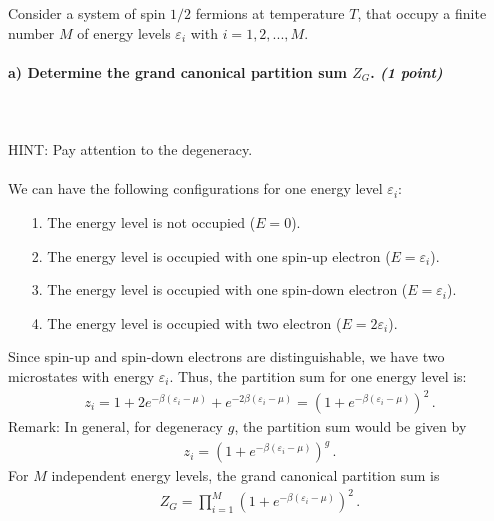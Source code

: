 Consider a system of spin $1/2$ fermions at temperature $T$, 
that occupy a finite number $M$ of energy levels 
$\varepsilon_i$ with $i=1,2,...,M$.


\paragraph{a) Determine the grand canonical partition sum $Z_G$.
    \textit{(1 point)}
} \ \\
    \\
    HINT: Pay attention to the degeneracy. \\
\\
We can have the following configurations for one energy level $\varepsilon_i$: 
\begin{itemize}
	\item[1.] The energy level is not occupied ($E=0$).
	\item[2.] The energy level is occupied with one spin-up electron ($E=\varepsilon_i$).
	\item[3.] The energy level is occupied with one spin-down electron ($E=\varepsilon_i$).
	\item[4.] The energy level is occupied with two electron ($E=2\varepsilon_i$).
\end{itemize}
Since spin-up and spin-down electrons are distinguishable, we have two microstates with 
energy $\varepsilon_i$. Thus, the partition sum for one energy level is:
\begin{align}
	z_i = 1+2e^{-\beta(\varepsilon_i-\mu)}+e^{-2\beta(\varepsilon_i-\mu)}
	= \left( 1+e^{-\beta(\varepsilon_i-\mu)} \right)^2 \,.
\end{align}
Remark: In general, for degeneracy $g$, the partition sum would be given by
\begin{align}
	z_i = \left( 1+e^{-\beta(\varepsilon_i-\mu)} \right)^g \,.
\end{align}
For $M$ independent energy levels, the grand canonical partition sum is
\begin{align}
	Z_G = \prod_{i=1}^M \left( 1+e^{-\beta(\varepsilon_i-\mu)} \right)^2 \,.
\end{align}

